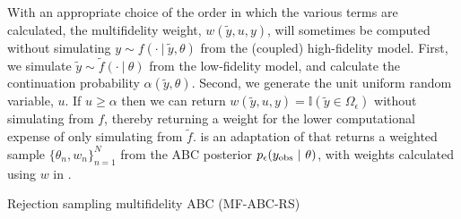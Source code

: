 \documentclass[review]{siamonline190516}
\begin{document}
With an appropriate choice of the order in which the various terms are calculated, the multifidelity weight, $w(\tilde y, u, y)$, will sometimes be computed without simulating $y \sim f(\cdot~|~\tilde y, \theta)$ from the (coupled) high-fidelity model.
First, we simulate $\tilde y \sim \tilde f(\cdot~|~\theta)$ from the low-fidelity model, and calculate the continuation probability $\alpha(\tilde y, \theta)$.
Second, we generate the unit uniform random variable, $u$.
If $u \geq \alpha$ then we can return $w(\tilde y, u, y) = \mathbb I(\tilde y \in \Omega_{\epsilon})$ without simulating from $f$, thereby returning a weight for the lower computational expense of only simulating from $\tilde f$.
 is an adaptation of  that returns a weighted sample $\{ \theta_n, w_n \}_{n=1}^N$ from the ABC posterior $p_\epsilon(y_{\mathrm{obs}} ~|~ \theta)$, with weights calculated using $w$ in .

\begin{algorithm}
\caption{Rejection sampling multifidelity ABC (MF-ABC-RS)}
\label{MFABC:Rejection}
\begin{algorithmic}[1]
\REPEAT{}
 \ENDIF{}
\end{algorithmic}
\end{algorithm}
\end{document}
